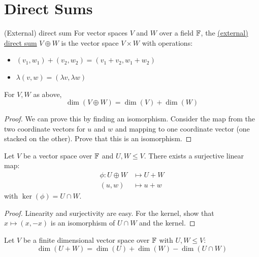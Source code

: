 \documentclass[../Main.tex]{subfiles}
\begin{document}
\section{Direct Sums}
\begin{definition}{(External) direct sum}
    For vector spaces $V$ and $W$ over a field $\mathbb{F}$, the \underline{(external) direct sum} $V \oplus W$ is the vector space $V \times W$ with operations:
    \begin{itemize}
        \item $(v_1, w_1) + (v_2, w_2) = (v_1+v_2, w_1 + w_2)$
        \item $\lambda(v, w) = (\lambda v, \lambda w)$
    \end{itemize}
\end{definition}
\begin{lemma}
    For $V, W$ as above,
    \begin{equation*}
        \dim(V \oplus W) = \dim(V) + \dim(W)
    \end{equation*}
    \label{lemSizeDirSum}
\end{lemma}
\begin{proof}
    We can prove this by finding an isomorphism. Consider the map from the two coordinate vectors for $u$ and $w$ and mapping to one coordinate vector (one stacked on the other). Prove that this is an isomorphism.
\end{proof}
\begin{proposition}
    Let $V$ be a vector space over $\mathbb{F}$ and $U, W \leq V$. There exists a surjective linear map:
    \begin{align*}
        \phi : U \oplus W &\mapsto U + W\\
        (u, w) &\mapsto u + w
    \end{align*}
    with $\ker(\phi) = U \cap W$.
    \label{propDirSumMapSum}
\end{proposition}
\begin{proof}
    Linearity and surjectivity are easy. For the kernel, show that $x \mapsto (x, -x)$ is an isomorphism of $U \cap W$ and the kernel.
\end{proof}
\begin{corollary}
    Let $V$ be a finite dimensional vector space over $\mathbb{F}$ with $U, W \leq V$:
    \begin{equation*}
        \dim(U + W) = \dim(U) + \dim(W) - \dim(U \cap W)
    \end{equation*}
    \label{corSumIntersection}
\end{corollary}
\end{document}
